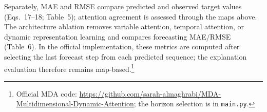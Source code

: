 Separately, MAE and RMSE compare predicted and observed target values
(Eqs.~17--18; Table~5); attention agreement is assessed through the maps above.
The architecture
ablation removes variable attention, temporal attention, or dynamic
representation learning and compares forecasting MAE/RMSE (Table~6).
In the official implementation, these metrics are computed after selecting
the last forecast step from each predicted sequence; the explanation evaluation
therefore remains map-based.\footnote{Official MDA code:
\url{https://github.com/sarah-almaghrabi/MDA-Multidimensional-Dynamic-Attention};
the horizon selection is in \texttt{main.py}.}

